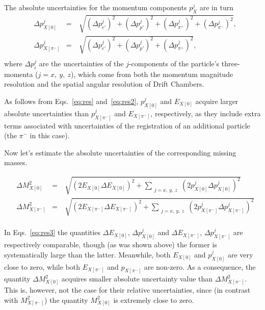 The absolute uncertainties for the momentum components $p_{X}^{j}$ are in turn\vspace{-0.5em}
\begin{equation}
\begin{aligned}
&\Delta p_{X[0]}^{j} &=&~\sqrt{ \left ( \Delta p_{e'}^{j} \right )^{2} + \left ( \Delta p_{p'}^{j} \right )^{2} +  \left ( \Delta p_{\pi^{+}}^{j} \right )^{2} + \left ( \Delta p_{\pi^{-}}^{j} \right )^{2}}, \\
&\Delta p_{X[\pi^{-}]}^{j} &=&~\sqrt{ \left ( \Delta p_{e'}^{j} \right )^{2} + \left ( \Delta p_{p'}^{j} \right )^{2} +  \left ( \Delta p_{\pi^{+}}^{j} \right )^{2}},\\[-7pt]
\end{aligned}\label{eq:res2}
\end{equation}
where $\Delta p_{i}^{j}$ are the uncertainties of the $j$-components of the particle's three-momenta ($j = x,~y,~z$), which come from both the momentum magnitude resolution and the spatial angular resolution of Drift Chambers.


As follows from Eqs.~\eqref{eq:res} and~\eqref{eq:res2}, $p_{X[0]}^{j}$ and $E_{X[0]}$ acquire larger absolute uncertainties than $p_{X[\pi^{-}]}^{j}$ and $E_{X[\pi^{-}]}$, respectively, as they include extra terms associated with uncertainties of the registration of an additional particle (the $\pi^{-}$ in this case).

Now let's estimate the absolute uncertainties of the corresponding missing masses.\vspace{-0.5em}


\begin{equation}
\begin{aligned}
&\Delta M_{X[0]}^{2} &=&~\sqrt{ \left (2E_{X[0]} \Delta E_{X[0]} \right )^{2} + \sum_{\substack{j = x,~y,~z}}\left (2p_{X[0]}^{j} \Delta p_{X[0]}^{j} \right )^{2}} \\
&\Delta M_{X[\pi^{-}]}^{2} &=&~\sqrt{ \left (2E_{X[\pi^{-}]} \Delta E_{X[\pi^{-}]} \right )^{2} +  \sum_{\substack{j = x,~y,~z}}\left (2p_{X[\pi^{-}]}^{j} \Delta p_{X[\pi^{-}]}^{j} \right )^{2}} \\[-7pt]
\end{aligned}\label{eq:res3}
\end{equation}

In Eqs.~\eqref{eq:res3} the quantities $\Delta E_{X[0]}$, $\Delta p_{X[0]}^{j}$ and $ \Delta E_{X[\pi^{-}]}$, $\Delta p_{X[\pi^{-}]}^{j}$ are respectively comparable, though (as was shown above) the former is systematically large than the latter. Meanwhile, both $E_{X[0]}$ and $p_{X[0]}^{j}$ are very close to zero, while both $E_{X[\pi^{-}]}$ and $p_{X[\pi^{-}]}$ are non-zero. As a consequence, the quantity $\Delta M_{X[0]}^{2}$ acquires smaller absolute uncertainty value than $\Delta M_{X[\pi^{-}]}^{2} $. This is, however, not the case for their relative uncertainties, since (in contrast with $M_{X[\pi^{-}]}^{2}$) the quantity $M_{X[0]}^{2}$ is extremely close to zero.



